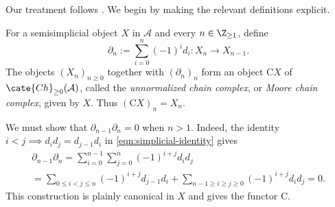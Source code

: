 Our treatment follows \cite[\S 1.2]{LuHA}. We begin by making the relevant
definitions explicit.

\begin{definition}\label{def:unnormalized-chain}
	For a semisimplicial object $X$ in $\mathcal{A}$ and every
	$n\in\Z_{\geq1}$, define
	\[ \partial_n := \sum_{i=0}^n (-1)^i d_i: X_n \to X_{n-1}. \]
	The objects $(X_n)_{n\geq0}$ together with $(\partial_n)_n$ form an
	object $\mathrm{C}X$ of $\cate{Ch}_{\geq0}(\mathcal{A})$, called the
	\emph{unnormalized chain complex}, or \emph{Moore chain complex}, given
	by $X$. Thus $(\mathrm{C}X)_n=X_n$.
\end{definition}

We must show that $\partial_{n-1}\partial_n=0$ when $n>1$. Indeed, the
identity $i<j\implies d_id_j=d_{j-1}d_i$ in
\eqref{eqn:simplicial-identity} gives
\begin{multline*}
	\partial_{n-1} \partial_n = \sum_{i=0}^{n-1} \sum_{j=0}^n (-1)^{i+j} d_i d_j \\
	= \sum_{0 \leq i < j \leq n} (-1)^{i+j} d_{j-1} d_i + \sum_{n-1 \geq i \geq j \geq 0} (-1)^{i+j} d_i d_j = 0.
\end{multline*}
This construction is plainly canonical in $X$ and gives the functor
$\mathrm{C}$.

